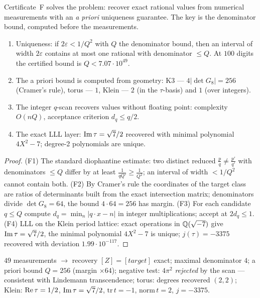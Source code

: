 Certificate~F solves the problem: recover exact rational values from
numerical measurements with an \emph{a priori} uniqueness guarantee.
The key is the denominator bound, computed before the measurements.

\begin{theorem}[F1--F4]\label{th:F}
\begin{enumerate}[leftmargin=2em, itemsep=0.15em]
\item[(F1)] Uniqueness: if $2\varepsilon<1/Q^2$ with $Q$ the
  denominator bound, then an interval of width $2\varepsilon$
  contains at most one rational with denominator $\le Q$. At $100$
  digits the certified bound is $Q<7.07\cdot10^{49}$.
\item[(F2)] The a priori bound is computed from geometry: K3 ---
  $4|\det G_8|=256$ (Cramer's rule), torus --- $1$, Klein --- $2$
  (in the $\tau$-basis) and $1$ (over integers).
\item[(F3)] The integer $q$-scan recovers values without floating
  point: complexity $O(nQ)$, acceptance criterion $d_q\le q/2$.
\item[(F4)] The exact LLL layer: $\operatorname{Im}\tau=\sqrt7/2$ recovered with
  minimal polynomial $4X^2-7$; degree-2 polynomials are unique.
\end{enumerate}
\end{theorem}

\begin{proof}
(F1) The standard diophantine estimate: two distinct reduced
$\frac pq\ne\frac{p'}{q'}$ with denominators $\le Q$ differ by at
least $\frac{1}{qQ'}\ge\frac{1}{Q^2}$; an interval of width
$<1/Q^2$ cannot contain both. (F2) By Cramer's rule the coordinates
of the target class are ratios of determinants built from the exact
intersection matrix; denominators divide $\det G_8=64$, the bound
$4\cdot64=256$ has margin. (F3) For each candidate $q\le Q$ compute
$d_q=\min_n|q\cdot x-n|$ in integer multiplications; accept at
$2d_q\le1$. (F4) LLL on the Klein period lattice: exact operations
in $\mathbb{Q}(\sqrt{-7})$ give $\operatorname{Im}\tau=\sqrt7/2$, the minimal polynomial
$4X^2-7$ is unique; $j(\tau)=-3375$ recovered with deviation
$1.99\cdot10^{-117}$.
\end{proof}

\begin{databox}
$49$ measurements $\to$ recovery $[Z]=[target]$ exact; maximal
denominator $4$; a priori bound $Q=256$ (margin $\times64$);
negative test: $4\pi^2$ \emph{rejected} by the scan --- consistent
with Lindemann transcendence; torus: degrees recovered $(2,2)$;
Klein: $\operatorname{Re}\tau=1/2$, $\operatorname{Im}\tau=\sqrt7/2$, $\mathrm{tr}\,t=-1$,
$\mathrm{norm}\,t=2$, $j=-3375$.
\end{databox}

